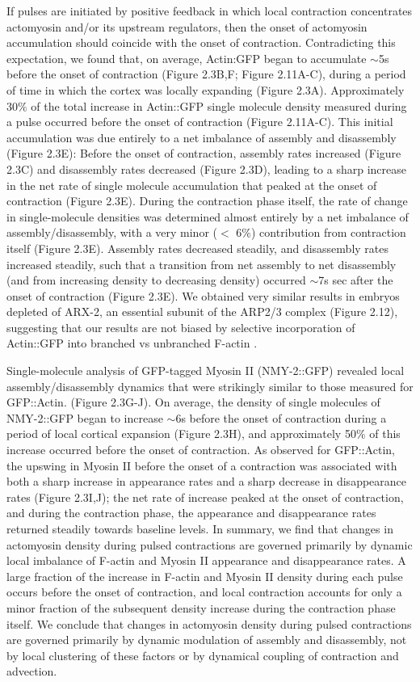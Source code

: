 \documentclass{ucetd}
\begin{document}
If pulses are initiated by positive feedback in which local contraction concentrates actomyosin and/or its upstream regulators, then the onset of actomyosin accumulation should coincide with the onset of contraction. Contradicting this expectation, we found that, on average, Actin:GFP began to accumulate $\sim$5s before the onset of contraction (Figure 2.3B,F; Figure 2.11A-C), during a period of time in which the cortex was locally expanding (Figure 2.3A). Approximately 30$\%$ of the total increase in Actin::GFP single molecule density measured during a pulse occurred before the onset of contraction (Figure 2.11A-C). This initial accumulation was due entirely to a net imbalance of assembly and disassembly (Figure 2.3E): Before the onset of contraction, assembly rates increased (Figure 2.3C) and disassembly rates decreased (Figure 2.3D), leading to a sharp increase in the net rate of single molecule accumulation that peaked at the onset of contraction (Figure 2.3E).  During the contraction phase itself, the rate of change in single-molecule densities was determined almost entirely by a net imbalance of assembly/disassembly, with a very minor (\(<\) 6$\%$) contribution from contraction itself (Figure 2.3E). Assembly rates decreased steadily, and disassembly rates increased steadily, such that a transition from net assembly to net disassembly  (and from increasing density to decreasing density) occurred $\sim$7s sec after the onset of contraction (Figure 2.3E).  We obtained very similar results in embryos depleted of ARX-2, an essential subunit of the ARP2/3 complex (Figure 2.12), suggesting that our results are not biased by selective incorporation of Actin::GFP into branched vs unbranched F-actin \cite{Chen:2012dx}.

Single-molecule analysis of GFP-tagged Myosin II (NMY-2::GFP) revealed local assembly/disassembly dynamics that were strikingly similar to those measured for GFP::Actin. (Figure 2.3G-J). On average, the density of single molecules of NMY-2::GFP began to increase $\sim$6s before the onset of contraction during a period of local cortical expansion (Figure 2.3H), and approximately 50$\%$ of this increase occurred before the onset of contraction. As observed for GFP::Actin, the upswing in Myosin II before the onset of a contraction was associated with both a sharp increase in appearance rates and a sharp decrease in disappearance rates (Figure 2.3I,J); the net rate of increase peaked at the onset of contraction, and during the contraction phase, the appearance and disappearance rates returned steadily towards baseline levels.
In summary, we find that changes in actomyosin density during pulsed contractions are governed primarily by dynamic local imbalance of F-actin and Myosin II appearance and disappearance rates. A large fraction of the increase in F-actin and Myosin II density during each pulse occurs before the onset of contraction, and local contraction accounts for only a minor fraction of the subsequent density increase during the contraction phase itself. We conclude that changes in actomyosin density during pulsed contractions are governed primarily by dynamic modulation of assembly and disassembly, not by local clustering of these factors or by dynamical coupling of contraction and advection.
\end{document}
